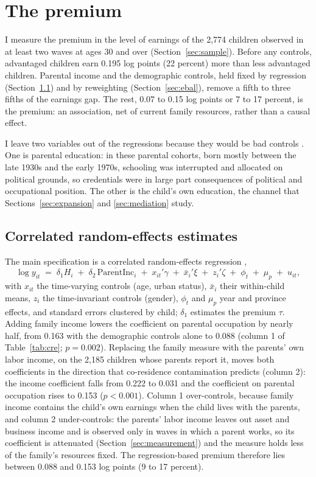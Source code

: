 \documentclass[11pt]{article}
\newcommand{\pinc}{\overline{\mathrm{ParentInc}}}
\begin{document}
\section{The premium}
\label{sec:premium}

I measure the premium in the level of earnings of the 2,774 children observed in at least two waves at ages 30 and over (Section~\ref{sec:sample}). Before any controls, advantaged children earn 0.195 log points (22 percent) more than less advantaged children. Parental income and the demographic controls, held fixed by regression (Section~\ref{sec:cre}) and by reweighting (Section~\ref{sec:ebal}), remove a fifth to three fifths of the earnings gap. The rest, 0.07 to 0.15 log points or 7 to 17 percent, is the premium: an association, net of current family resources, rather than a causal effect.

I leave two variables out of the regressions because they would be bad controls \citep{AngristPischke2009, AcharyaBlackwellSen2016}. One is parental education: in these parental cohorts, born mostly between the late 1930s and the early 1970s, schooling was interrupted and allocated on political grounds, so credentials were in large part consequences of political and occupational position. The other is the child's own education, the channel that Sections~\ref{sec:expansion} and \ref{sec:mediation} study.

\subsection{Correlated random-effects estimates}
\label{sec:cre}

The main specification is a correlated random-effects regression \citep{Mundlak1978},
\begin{equation}
\log y_{it} \;=\; \delta_1 H_i \;+\; \delta_2\, \pinc_i \;+\; x_{it}'\gamma \;+\; \bar x_i'\xi \;+\; z_i'\zeta \;+\; \phi_t \;+\; \mu_p \;+\; u_{it},
\label{eq:cre}
\end{equation}
with $x_{it}$ the time-varying controls (age, urban status), $\bar x_i$
their within-child means, $z_i$ the time-invariant controls (gender), $\phi_t$ and $\mu_p$ year and province effects, and standard errors clustered by child; $\delta_1$ estimates the premium
$\tau$. Adding family income lowers the coefficient on parental occupation by nearly half, from 0.163 with the demographic controls alone to 0.088 (column 1 of Table~\ref{tab:cre}; $p = 0.002$). Replacing the family measure with the parents' own labor income, on the 2,185 children whose parents report it, moves
both coefficients in the direction that co-residence contamination predicts (column 2): the income coefficient falls from 0.222 to 0.031 and the coefficient on parental occupation rises to 0.153 ($p < 0.001$). Column 1 over-controls, because family income contains the child's own earnings when the child lives with the parents, and column 2 under-controls: the parents' labor income leaves out asset and business income and is observed only in waves in which a parent works, so its coefficient is attenuated (Section~\ref{sec:measurement}) and the measure holds less of the family's resources fixed. The regression-based premium therefore lies between 0.088 and 0.153 log points (9 to 17 percent).
\end{document}

